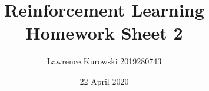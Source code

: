 \documentclass[a4paper,twoside,12pt,fleqn]{scrartcl}
\begin{document}
\title{Reinforcement Learning\\Homework Sheet 2}
\subtitle{Lawrence Kurowski 2019280743}
\date{22 April 2020}
\maketitle


%
%

%
\end{document}
